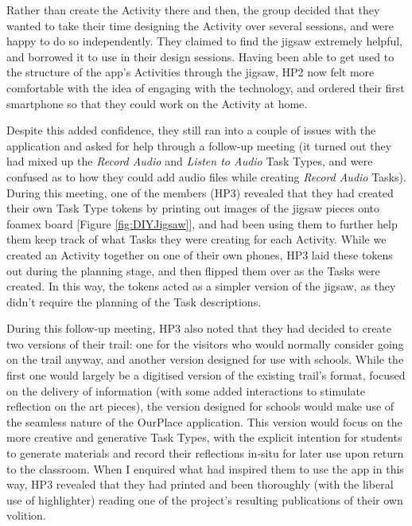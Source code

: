 Rather than create the Activity there and then, the group decided that they wanted to take their time designing the Activity over several sessions, and were happy to do so independently. They claimed to find the jigsaw extremely helpful, and borrowed it to use in their design sessions. Having been able to get used to the structure of the app's Activities through the jigsaw, HP2 now felt more comfortable with the idea of engaging with the technology, and ordered their first smartphone so that they could work on the Activity at home.

Despite this added confidence, they still ran into a couple of issues with the application and asked for help through a follow-up meeting (it turned out they had mixed up the \textit{Record Audio} and \textit{Listen to Audio} Task Types, and were confused as to how they could add audio files while creating \textit{Record Audio} Tasks). During this meeting, one of the members (HP3) revealed that they had created their own Task Type tokens by printing out images of the jigsaw pieces onto foamex board [Figure \ref{fig:DIYJigsaw}], and had been using them to further help them keep track of what Tasks they were creating for each Activity. While we created an Activity together on one of their own phones, HP3 laid these tokens out during the planning stage, and then flipped them over as the Tasks were created. In this way, the tokens acted as a simpler version of the jigsaw, as they didn't require the planning of the Task descriptions.

During this follow-up meeting, HP3 also noted that they had decided to create two versions of their trail: one for the visitors who would normally consider going on the trail anyway, and another version designed for use with schools. While the first one would largely be a digitised version of the existing trail's format, focused on the delivery of information (with some added interactions to stimulate reflection on the art pieces), the version designed for schools would make use of the seamless nature of the OurPlace application. This version would focus on the more creative and generative Task Types, with the explicit intention for students to generate materials and record their reflections in-situ for later use upon return to the classroom. When I enquired what had inspired them to use the app in this way, HP3 revealed that they had printed and been thoroughly (with the liberal use of highlighter) reading one of the project's resulting publications \citep{Richardson2018} of their own volition.

